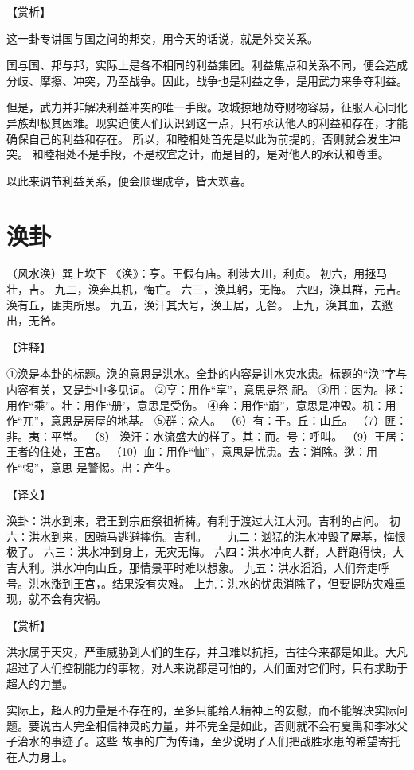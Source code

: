 \documentclass[12pt,UTF8]{ctexbook}
\begin{document}
【赏析】

这一卦专讲国与国之间的邦交，用今天的话说，就是外交关系。

国与国、邦与邦，实际上是各不相同的利益集团。利益焦点和关系不同，便会造成分歧、摩擦、冲突，乃至战争。因此，战争也是利益之争，是用武力来争夺利益。

但是，武力并非解决利益冲突的唯一手段。攻城掠地劫夺财物容易，征服人心同化异族却极其困难。现实迫使人们认识到这一点，只有承认他人的利益和存在，才能确保自己的利益和存在。 所以，和睦相处首先是以此为前提的，否则就会发生冲突。 和睦相处不是手段，不是权宜之计，而是目的，是对他人的承认和尊重。

以此来调节利益关系，便会顺理成章，皆大欢喜。

\chapter{涣卦}

（风水涣）巽上坎下
《涣》：亨。王假有庙。利涉大川，利贞。
初六，用拯马壮，吉。
九二，涣奔其机，悔亡。
六三，涣其躬，无悔。
六四，涣其群，元吉。涣有丘，匪夷所思。
九五，涣汗其大号，涣王居，无咎。
上九，涣其血，去逖出，无咎。

【注释】

①涣是本卦的标题。涣的意思是洪水。全卦的内容是讲水灾水患。标题的“涣”字与内容有关，又是卦中多见词。
②亨：用作“享”，意思是祭 祀。
③用：因为。拯：用作“乘”。壮：用作“册’，意思是受伤。
④奔：用作“崩”，意思是冲毁。机：用作“兀”，意思是房屋的地基。
⑤群：众人。
（6）有：于。丘：山丘。
（7）匪：非。夷：平常。
（8） 涣汗：水流盛大的样子。其：而。号：呼叫。
（9）王居：王者的住处，王宫。
（10）血：用作“恤”，意思是忧患。去：消除。逖：用作“惕”，意思 是警惕。出：产生。

【译文】

涣卦：洪水到来，君王到宗庙祭祖祈祷。有利于渡过大江大河。吉利的占问。
初六：洪水到来，因骑马逃避摔伤。吉利。　　
九二：汹猛的洪水冲毁了屋基，悔恨极了。
六三：洪水冲到身上，无灾无悔。
六四：洪水冲向人群，人群跑得快，大吉大利。洪水冲向山丘，那情景平时难以想象。
九五：洪水滔滔，人们奔走呼号。洪水涨到王宫，。结果没有灾难。
上九：洪水的忧患消除了，但要提防灾难重现，就不会有灾祸。

【赏析】

洪水属于天灾，严重威胁到人们的生存，并且难以抗拒，古往今来都是如此。大凡超过了人们控制能力的事物，对人来说都是可怕的，人们面对它们时，只有求助于超人的力量。

实际上，超人的力量是不存在的，至多只能给人精神上的安慰，而不能解决实际问题。要说古人完全相信神灵的力量，并不完全是如此，否则就不会有夏禹和李冰父子治水的事迹了。这些 故事的广为传诵，至少说明了人们把战胜水患的希望寄托在人力身上。
\end{document}
